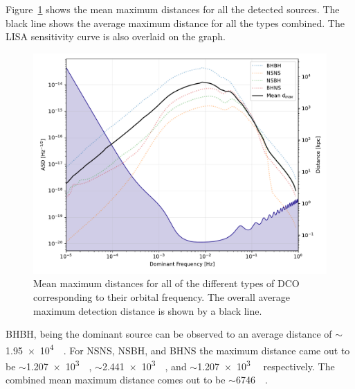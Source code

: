 \documentclass[journal, twocolumns]{IEEEtran}
\newcommand{\kpc}{\kilo\parsec}
\newcommand{\scientific}[2]{\SI[scientific-notation=engineering, exponent-to-prefix]{#1}{#2}}
\begin{document}
    Figure~\ref{fig:dmax} shows the mean maximum distances for all the detected sources.
    The black line shows the average maximum distance for all the types combined.
    The LISA sensitivity curve is also overlaid on the graph.

	\begin{figure}[!h]
		\centering
		\includegraphics[width=\linewidth]{analysis_data/d_max}
		\caption{Mean maximum distances for all of the different types of DCO corresponding to their orbital frequency. The overall average maximum detection distance is shown by a black line.}
		\label{fig:dmax}
	\end{figure}

    BHBH, being the dominant source can be observed to an average distance of $\sim$\scientific{1.95e4}{\kpc}.
   	For NSNS, NSBH, and BHNS the maximum distance came out to be $\sim$\scientific{1.207e3}{\kpc}, $\sim$\scientific{2.441e3}{\kpc}, and $\sim$\scientific{1.207e3}{\kpc} respectively.
   	The combined mean maximum distance comes out to be $\sim$\scientific{6746}{\kpc}.
\end{document}
